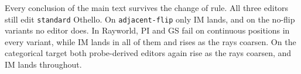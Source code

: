 \documentclass{article} %
\begin{document}
Every conclusion of the main text survives the change of rule. All three editors still edit \texttt{standard} Othello. On \texttt{adjacent-flip} only IM lands, and on the no-flip variants no editor does. In Rayworld, PI and GS fail on continuous positions in every variant, while IM lands in all of them and rises as the rays coarsen. On the categorical target both probe-derived editors again rise as the rays coarsen, and IM lands throughout.

\end{document}
